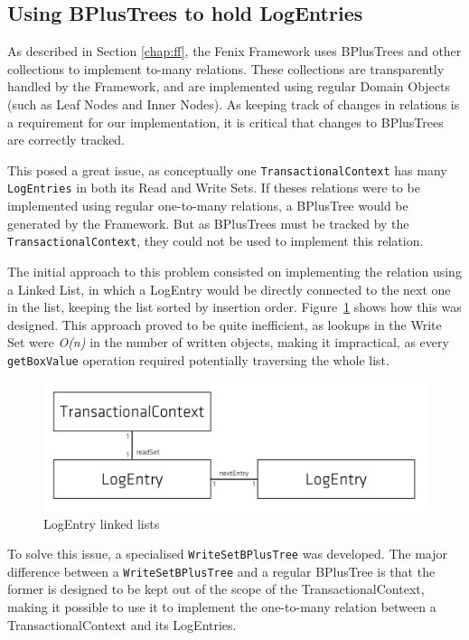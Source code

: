 \documentclass{llncs}
\begin{document}
\subsection{Using BPlusTrees to hold LogEntries}

As described in Section \ref{chap:ff}, the Fenix Framework uses
BPlusTrees and other collections to implement to-many relations. These
collections are transparently handled by the Framework, and are
implemented using regular Domain Objects (such as Leaf Nodes and Inner
Nodes). As keeping track of changes in relations is a requirement for
our implementation, it is critical that changes to BPlusTrees are
correctly tracked.

This posed a great issue, as conceptually one
\texttt{TransactionalContext} has many \texttt{LogEntries} in both its
Read and Write Sets. If theses relations were to be implemented using
regular one-to-many relations, a BPlusTree would be generated by the
Framework. But as BPlusTrees must be tracked by the
\texttt{TransactionalContext}, they could not be used to implement
this relation.

The initial approach to this problem consisted on implementing the
relation using a Linked List, in which a LogEntry would be directly
connected to the next one in the list, keeping the list sorted by
insertion order. Figure~\ref{fig:linkedList} shows how this was
designed. This approach proved to be quite inefficient, as lookups in
the Write Set were {\it O(n)} in the number of written objects, making
it impractical, as every \texttt{getBoxValue} operation required
potentially traversing the whole list.

\begin{figure}
\centering
\includegraphics[width=0.7\linewidth]{tx-context-v1}
\caption{LogEntry linked lists}
\label{fig:linkedList}
\end{figure}

To solve this issue, a specialised \texttt{WriteSetBPlusTree} was
developed. The major difference between a \texttt{WriteSetBPlusTree}
and a regular BPlusTree is that the former is designed to be kept out
of the scope of the TransactionalContext, making it possible to use it
to implement the one-to-many relation between a TransactionalContext
and its LogEntries.
\end{document}
